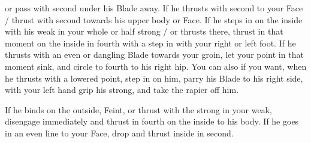 \newpage


\newpage

 
or pass with second under his Blade away. If  he thrusts with second
to your Face / thrust with second towards his upper body or Face. If
he steps in on the inside with his weak in your whole or half strong /
or thrusts there, thrust in that moment on the inside in fourth with a step in
with your right or left foot. If he thrusts with an even or dangling
Blade towards your groin, let your point in that moment sink, and
circle to fourth to his right hip. You can also if you want, when he
thrusts with a lowered point, step in on him, parry his Blade to his
right side, with your left hand grip his strong, and take the rapier
off him.


If he binds on the outside, Feint, or thrust with the strong in your
weak, disengage immediately and thrust in fourth on the inside to his
body. If he goes in an even line to your Face, drop and thrust inside
in second.



